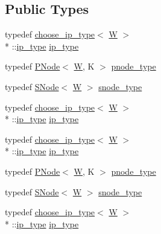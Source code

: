 \subsection*{Public Types}
\begin{DoxyCompactItemize}
\item 
typedef \hyperlink{types_8h_structchoose__ip__type}{choose\-\_\-ip\-\_\-type}$<$ \hyperlink{test__u128_8cpp_ab21b528bc38899d04d3a7053e52fb797}{W} $>$\\*
\-::\hyperlink{structPNode_a61bb3b468d24d7a913120fffd4b4cb26}{ip\-\_\-type} \hyperlink{structPNode_a61bb3b468d24d7a913120fffd4b4cb26}{ip\-\_\-type}
\item 
typedef \hyperlink{structPNode}{P\-Node}$<$ \hyperlink{test__u128_8cpp_ab21b528bc38899d04d3a7053e52fb797}{W}, K $>$ \hyperlink{structPNode_a9f0e0153a9ff0faff3baa323c601f03a}{pnode\-\_\-type}
\item 
typedef \hyperlink{structSNode}{S\-Node}$<$ \hyperlink{test__u128_8cpp_ab21b528bc38899d04d3a7053e52fb797}{W} $>$ \hyperlink{structPNode_a7d5f0e3af582a8c9f59a479f99a6ac09}{snode\-\_\-type}
\item 
typedef \hyperlink{types_8h_structchoose__ip__type}{choose\-\_\-ip\-\_\-type}$<$ \hyperlink{test__u128_8cpp_ab21b528bc38899d04d3a7053e52fb797}{W} $>$\\*
\-::\hyperlink{structPNode_a61bb3b468d24d7a913120fffd4b4cb26}{ip\-\_\-type} \hyperlink{structPNode_a61bb3b468d24d7a913120fffd4b4cb26}{ip\-\_\-type}
\item 
typedef \hyperlink{types_8h_structchoose__ip__type}{choose\-\_\-ip\-\_\-type}$<$ \hyperlink{test__u128_8cpp_ab21b528bc38899d04d3a7053e52fb797}{W} $>$\\*
\-::\hyperlink{structPNode_a61bb3b468d24d7a913120fffd4b4cb26}{ip\-\_\-type} \hyperlink{structPNode_a61bb3b468d24d7a913120fffd4b4cb26}{ip\-\_\-type}
\item 
typedef \hyperlink{structPNode}{P\-Node}$<$ \hyperlink{test__u128_8cpp_ab21b528bc38899d04d3a7053e52fb797}{W}, K $>$ \hyperlink{structPNode_a1b352e46062624fb69f76221f4e183e7}{pnode\-\_\-type}
\item 
typedef \hyperlink{structSNode}{S\-Node}$<$ \hyperlink{test__u128_8cpp_ab21b528bc38899d04d3a7053e52fb797}{W} $>$ \hyperlink{structPNode_a7d5f0e3af582a8c9f59a479f99a6ac09}{snode\-\_\-type}
\item 
typedef \hyperlink{types_8h_structchoose__ip__type}{choose\-\_\-ip\-\_\-type}$<$ \hyperlink{test__u128_8cpp_ab21b528bc38899d04d3a7053e52fb797}{W} $>$\\*
\-::\hyperlink{structPNode_a61bb3b468d24d7a913120fffd4b4cb26}{ip\-\_\-type} \hyperlink{structPNode_a61bb3b468d24d7a913120fffd4b4cb26}{ip\-\_\-type}
\end{DoxyCompactItemize}
